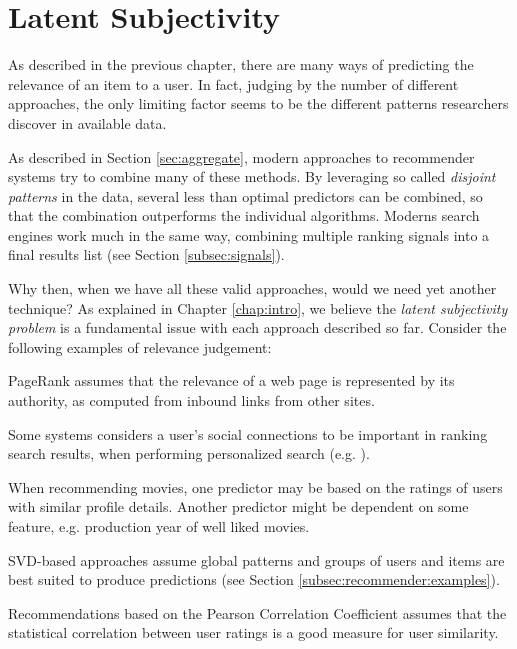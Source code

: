 \section{Latent Subjectivity}
\label{sec:reasoning}

As described in the previous chapter, 
there are many ways of predicting the
relevance of an item to a user. 
In fact, judging by the number of different approaches,
the only limiting factor seems to be the different 
patterns researchers discover in available data.

As described in Section \ref{sec:aggregate},
modern approaches to recommender systems try to combine many of these methods.
By leveraging so called \emph{disjoint patterns}
in the data, several less than optimal predictors
can be combined, so that the combination outperforms the individual algorithms.
Moderns search engines work much in the same way,
combining multiple ranking signals into a final results list
(see Section \ref{subsec:signals}).

Why then, when we have all these valid approaches, would we need yet another technique?
As explained in Chapter \ref{chap:intro}, 
we believe the \emph{latent subjectivity problem}
is a fundamental issue with each approach described so far.
Consider the following examples of relevance judgement:

\begin{itemize*}
  \item PageRank \citep{Bender2005} assumes that the relevance of a web page is 
  represented by its authority, as computed from inbound links from other sites.
  \item Some systems considers a user's social connections to be important
  in ranking search results, when performing personalized search (e.g. \cite{Carmel2009}).
  \item When recommending movies, one predictor may be based on the ratings
  of users with similar profile details. Another predictor might be 
  dependent on some feature, e.g. production year of well liked movies.
  \item SVD-based approaches assume global patterns and groups of users and items
  are best suited to produce predictions (see Section \ref{subsec:recommender:examples}).
  \item Recommendations based on the Pearson Correlation Coefficient \cite[p.11]{Segaran2007}
  assumes that the statistical correlation between user ratings is a good
  measure for user similarity.
\end{itemize*}

